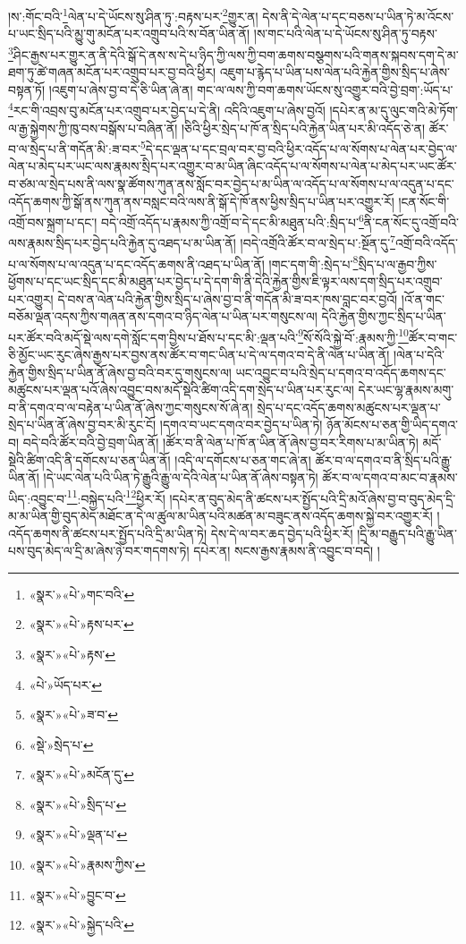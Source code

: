 །ས་:གོང་བའི་\footnote{«སྣར་»«པེ་»གང་བའི་}ལེན་པ་དེ་ཡོངས་སུ་ཤིན་ཏུ་:བརྟས་པར་\footnote{«སྣར་»«པེ་»རྟས་པར་}གྱུར་ན། དེས་ནི་དེ་ལེན་པ་དང་བཅས་པ་ཡིན་ཏེ་མ་འོངས་པ་ཡང་སྲིད་པའི་མྱུ་གུ་མངོན་པར་འགྲུབ་པའི་ས་བོན་ཡིན་ནོ། །ས་གང་པའི་ལེན་པ་དེ་ཡོངས་སུ་ཤིན་ཏུ་བརྟས་\footnote{«སྣར་»«པེ་»རྟས་}ཤིང་རྒྱས་པར་གྱུར་ན་ནི་དེའི་སྒོ་དེ་ནས་ས་དེ་པ་ཉིད་ཀྱི་ལས་ཀྱི་བག་ཆགས་བསྩགས་པའི་གནས་སྐབས་དག་དེ་མ་ཐག་ཏུ་ཚེ་གཞན་མངོན་པར་འགྲུབ་པར་བྱ་བའི་ཕྱིར། འཇུག་པ་རྙེད་པ་ཡིན་པས་ལེན་པའི་རྐྱེན་གྱིས་སྲིད་པ་ཞེས་བསྟན་ཏོ། །འཇུག་པ་ཞེས་བྱ་བ་དེ་ཅི་ཡིན་ཞེ་ན། གང་ལ་ལས་ཀྱི་བག་ཆགས་ཡོངས་སུ་འགྱུར་བའི་བྱེ་བྲག་:ཡོད་པ་\footnote{«པེ་»ཡོད་པར་}རང་གི་འབྲས་བུ་མངོན་པར་འགྲུབ་པར་བྱེད་པ་དེ་ནི། འདིའི་འཇུག་པ་ཞེས་བྱའོ། །དཔེར་ན་མ་དུ་ལུང་གའི་མེ་ཏོག་ལ་རྒྱ་སྐྱེགས་ཀྱི་ཁུ་བས་བསྒོས་པ་བཞིན་ནོ། །ཅིའི་ཕྱིར་སྲེད་པ་ཁོ་ན་སྲིད་པའི་རྐྱེན་ཡིན་པར་མི་འདོད་ཅེ་ན། ཚོར་བ་ལ་སྲེད་པ་ནི་གདོན་མི་:ཟ་བར་\footnote{«སྣར་»«པེ་»ཟ་བ་}དེ་དང་ལྡན་པ་དང་བྲལ་བར་བྱ་བའི་ཕྱིར་འདོད་པ་ལ་སོགས་པ་ལེན་པར་བྱེད་ལ་ལེན་པ་མེད་པར་ཡང་ལས་རྣམས་སྲིད་པར་འགྱུར་བ་མ་ཡིན་ཞིང་འདོད་པ་ལ་སོགས་པ་ལེན་པ་མེད་པར་ཡང་ཚོར་བ་ཙམ་ལ་སྲེད་པས་ནི་ལས་སྣ་ཚོགས་ཀུན་ནས་སློང་བར་བྱེད་པ་མ་ཡིན་ལ་འདོད་པ་ལ་སོགས་པ་ལ་འདུན་པ་དང་འདོད་ཆགས་ཀྱི་སྒོ་ནས་ཀུན་ནས་བསླང་བའི་ལས་ནི་སྒོ་དེ་ཁོ་ནས་ཕྱིས་སྲིད་པ་ཡིན་པར་འགྱུར་རོ། །ངན་སོང་གི་འགྲོ་བས་སྐྲག་པ་དང་། བདེ་འགྲོ་འདོད་པ་རྣམས་ཀྱི་འགྲོ་བ་དེ་དང་མི་མཐུན་པའི་:སྲིད་པ་\footnote{«སྡེ་»སྲེད་པ་}ནི་ངན་སོང་དུ་འགྲོ་བའི་ལས་རྣམས་སྲིད་པར་བྱེད་པའི་རྐྱེན་དུ་འཐད་པ་མ་ཡིན་ནོ། །བདེ་འགྲོའི་ཚོར་བ་ལ་སྲེད་པ་:སྔོན་དུ་\footnote{«སྣར་»«པེ་»མངོན་དུ་}འགྲོ་བའི་འདོད་པ་ལ་སོགས་པ་ལ་འདུན་པ་དང་འདོད་ཆགས་ནི་འཐད་པ་ཡིན་ནོ། །གང་དག་གི་:སྲེད་པ་\footnote{«སྣར་»«པེ་»སྲིད་པ་}སྲིད་པ་ལ་རྒྱབ་ཀྱིས་ཕྱོགས་པ་དང་ཡང་སྲིད་དང་མི་མཐུན་པར་བྱེད་པ་དེ་དག་གི་ནི་དེའི་རྐྱེན་གྱིས་ཇི་ལྟར་ལས་དག་སྲིད་པར་འགྲུབ་པར་འགྱུར། དེ་བས་ན་ལེན་པའི་རྐྱེན་གྱིས་སྲིད་པ་ཞེས་བྱ་བ་ནི་གདོན་མི་ཟ་བར་ཁས་བླང་བར་བྱའོ། །འོ་ན་གང་བཅོམ་ལྡན་འདས་ཀྱིས་གཞན་ནས་དགའ་བ་ཉིད་ལེན་པ་ཡིན་པར་གསུངས་ལ། དེའི་རྐྱེན་གྱིས་ཀྱང་སྲིད་པ་ཡིན་པར་ཚོར་བའི་མདོ་སྡེ་ལས་དགེ་སློང་དག་བྱིས་པ་ཐོས་པ་དང་མི་:ལྡན་པའི་\footnote{«སྣར་»«པེ་»ལྡན་པ་}སོ་སོའི་སྐྱེ་བོ་:རྣམས་ཀྱི་\footnote{«སྣར་»«པེ་»རྣམས་ཀྱིས་}ཚོར་བ་གང་ཅི་མྱོང་ཡང་རུང་ཞེས་རྒྱས་པར་བྱས་ནས་ཚོར་བ་གང་ཡིན་པ་དེ་ལ་དགའ་བ་དེ་ནི་ལེན་པ་ཡིན་ནོ། །ལེན་པ་དེའི་རྐྱེན་གྱིས་སྲིད་པ་ཡིན་ནོ་ཞེས་བྱ་བའི་བར་དུ་གསུངས་ལ། ཡང་འབྱུང་བ་པའི་སྲེད་པ་དགའ་བ་འདོད་ཆགས་དང་མཚུངས་པར་ལྡན་པའོ་ཞེས་འབྱུང་བས་མདོ་སྡེའི་ཚིག་འདི་དག་སྲེད་པ་ཡིན་པར་རུང་ལ། དེར་ཡང་ལྷ་རྣམས་མགུ་བ་ནི་དགའ་བ་ལ་བརྟེན་པ་ཡིན་ནོ་ཞེས་ཀྱང་གསུངས་སོ་ཞེ་ན། སྲེད་པ་དང་འདོད་ཆགས་མཚུངས་པར་ལྡན་པ་སྲེད་པ་ཡིན་ནོ་ཞེས་བྱ་བར་མི་རུང་ངོ། །དགའ་བ་ཡང་དགའ་བར་བྱེད་པ་ཡིན་ཏེ། ཉོན་མོངས་པ་ཅན་གྱི་ཡིད་དགའ་བ། བདེ་བའི་ཚོར་བའི་བྱེ་བྲག་ཡིན་ནོ། །ཚོར་བ་ནི་ལེན་པ་ཁོ་ན་ཡིན་ནོ་ཞེས་བྱ་བར་རིགས་པ་མ་ཡིན་ཏེ། མདོ་སྡེའི་ཚིག་འདི་ནི་དགོངས་པ་ཅན་ཡིན་ནོ། །འདི་ལ་དགོངས་པ་ཅན་གང་ཞེ་ན། ཚོར་བ་ལ་དགའ་བ་ནི་སྲིད་པའི་རྒྱུ་ཡིན་ནོ། །དེ་ཡང་ལེན་པའི་ཡིན་ཏེ་རྒྱུའི་རྒྱུ་ལ་དེའི་ལེན་པ་ཡིན་ནོ་ཞེས་བསྟན་ཏེ། ཚོར་བ་ལ་དགའ་བ་མང་བ་རྣམས་ཡིད་:འབྱུང་བ་\footnote{«སྣར་»«པེ་»བྱུང་བ་}:བསྐྱེད་པའི་\footnote{«སྣར་»«པེ་»སྐྱེད་པའི་}ཕྱིར་རོ། །དཔེར་ན་བུད་མེད་ནི་ཚངས་པར་སྤྱོད་པའི་དྲི་མའོ་ཞེས་བྱ་བ་བུད་མེད་དྲི་མ་མ་ཡིན་གྱི་བུད་མེད་མཐོང་ན་དེ་ལ་ཚུལ་མ་ཡིན་པའི་མཚན་མ་བཟུང་ནས་འདོད་ཆགས་སྐྱེ་བར་འགྱུར་རོ། །འདོད་ཆགས་ནི་ཚངས་པར་སྤྱོད་པའི་དྲི་མ་ཡིན་ཏེ། དེས་དེ་ལ་བར་ཆད་བྱེད་པའི་ཕྱིར་རོ། །དྲི་མ་བརྒྱུད་པའི་རྒྱུ་ཡིན་པས་བུད་མེད་ལ་དྲི་མ་ཞེས་ཉེ་བར་གདགས་ཏེ། དཔེར་ན། སངས་རྒྱས་རྣམས་ནི་འབྱུང་བ་བདེ། །

